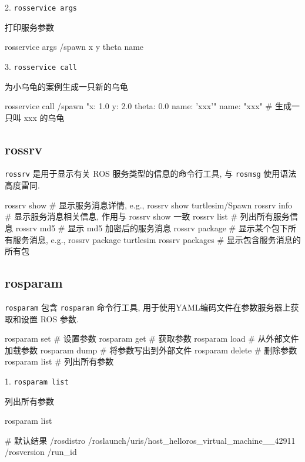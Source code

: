 \documentclass[openany, fontset=windowsold]{ctexbook}
\theoremstyle{kaiti}
\theoremstyle{normal}
\begin{document}
2. \verb|rosservice args|

打印服务参数

\begin{bash}
  rosservice args /spawn
  x y theta name
\end{bash}

3. \verb|rosservice call|

为小乌龟的案例生成一只新的乌龟

\begin{bash}
  rosservice call /spawn "x: 1.0 
  y: 2.0
  theta: 0.0
  name: 'xxx'"
  name: "xxx"
  # 生成一只叫 xxx 的乌龟
\end{bash}

\subsection{rossrv}

\verb|rossrv| 是用于显示有关 ROS 服务类型的信息的命令行工具, 与 \verb|rosmsg| 使用语法高度雷同.

\begin{bash}
  rossrv show         # 显示服务消息详情, e.g., rossrv show turtlesim/Spawn
  rossrv info         # 显示服务消息相关信息, 作用与 rossrv show 一致
  rossrv list         # 列出所有服务信息
  rossrv md5          # 显示 md5 加密后的服务消息
  rossrv package      # 显示某个包下所有服务消息, e.g., rossrv package turtlesim
  rossrv packages     # 显示包含服务消息的所有包
\end{bash}

\subsection{rosparam}

\verb|rosparam| 包含 \verb|rosparam| 命令行工具, 用于使用YAML编码文件在参数服务器上获取和设置 ROS 参数.

\begin{bash}
  rosparam set        # 设置参数
  rosparam get        # 获取参数
  rosparam load       # 从外部文件加载参数
  rosparam dump       # 将参数写出到外部文件
  rosparam delete     # 删除参数
  rosparam list       # 列出所有参数
\end{bash}

1. \verb|rosparam list|

列出所有参数

\begin{bash}
  rosparam list

  # 默认结果
  /rosdistro
  /roslaunch/uris/host_helloros_virtual_machine__42911
  /rosversion
  /run_id
\end{bash}
\end{document}
